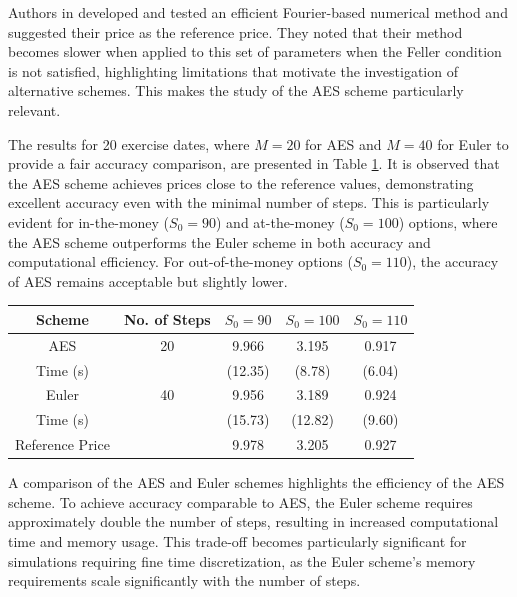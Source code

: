 \documentclass[]{interact}
\theoremstyle{plain}%
\theoremstyle{definition}
\theoremstyle{remark}
\begin{document}
Authors in \cite{fang2011fourier} developed and tested an efficient Fourier-based numerical method and suggested their price as the reference price. They noted that their method becomes slower when applied to this set of parameters when the Feller condition is not satisfied, highlighting limitations that motivate the investigation of alternative schemes. This makes the study of the AES scheme particularly relevant.

The results for 20 exercise dates, where \( M = 20 \) for AES and \( M = 40 \) for Euler to provide a fair accuracy comparison, are presented in Table \ref{table:BermudanNonFeller}. It is observed that the AES scheme achieves prices close to the reference values, demonstrating excellent accuracy even with the minimal number of steps. This is particularly evident for in-the-money (\( S_0 = 90 \)) and at-the-money (\( S_0 = 100 \)) options, where the AES scheme outperforms the Euler scheme in both accuracy and computational efficiency. For out-of-the-money options (\( S_0 = 110 \)), the accuracy of AES remains acceptable but slightly lower.

\begin{table}
{\begin{tabular}{ccccc} \toprule
Scheme & No. of Steps & $S_0 = 90$ & $S_0 = 100$ & $S_0 = 110$ \\ 
\midrule
AES    & 20 & 9.966 & 3.195 & 0.917 \\ 
Time (s) & & (12.35) & (8.78) & (6.04) \\ 
\midrule
Euler  & 40 & 9.956 & 3.189 & 0.924 \\ 
Time (s) & & (15.73) & (12.82) & (9.60) \\ 
\midrule
Reference Price &  & 9.978 & 3.205 & 0.927 \\
\bottomrule
\end{tabular}}
\label{table:BermudanNonFeller}
\end{table}

A comparison of the AES and Euler schemes highlights the efficiency of the AES scheme. To achieve accuracy comparable to AES, the Euler scheme requires approximately double the number of steps, resulting in increased computational time and memory usage. This trade-off becomes particularly significant for simulations requiring fine time discretization, as the Euler scheme's memory requirements scale significantly with the number of steps.
\end{document}
